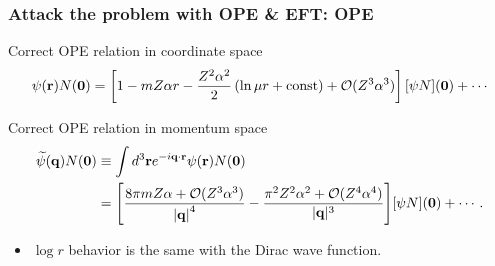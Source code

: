 \begin{frame}
	\frametitle{Attack the problem with OPE \& EFT: OPE}

	
	\onslide<+->
	\begin{block}{\large Correct OPE relation in coordinate space}
		\begin{align*}
			\psi({\bf r})N({\bf 0}) =\bqty{1- mZ\alpha r -{Z^2\alpha^2\over 2} \left(\ln \mu r+{\rm const} \right)
			+{\cal O}(Z^3\alpha^3)}\,[\psi N]({\bf 0})+\cdots
		\end{align*}
	\end{block}

	\begin{block}{\large Correct OPE relation in momentum space}
		\begin{align*}
			\widetilde\psi({\bf q})N({\bf 0}) & \equiv \int d^3 {\bf r}
			e^{-i {\bf q}\cdot {\bf r}} \psi({\bf r})N({\bf 0})\nonumber\\&= 
			\bqty{{8\pi mZ\alpha+{\cal O}(Z^3\alpha^3) \over \abs{\bf q}^4}
			- {\pi^2 Z^2\alpha^2+{\cal O}(Z^4\alpha^4) \over |{\bf q}|^3}} [\psi N]({\bf 0})+\cdots.
		\end{align*}
	\end{block}
	\begin{itemize}
		\item $\log r$ behavior is the same with the Dirac wave function. 
	\end{itemize}
\end{frame}

